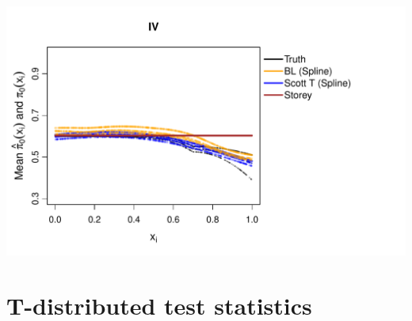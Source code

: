 \documentclass{article}\usepackage[]{graphicx}\usepackage[]{color}
\makeatletter
\def\maxwidth{ %
  \ifdim\Gin@nat@width>\linewidth
    \linewidth
  \else
    \Gin@nat@width
  \fi
}
\newenvironment{knitrout}{}{} %
\makeatother
\begin{document}
\begin{knitrout}
{\includegraphics[width=\maxwidth]{Figures/plot_of_mean_estimates_norm-7} 

}



\end{knitrout}

\section{T-distributed test statistics}
\end{document}
